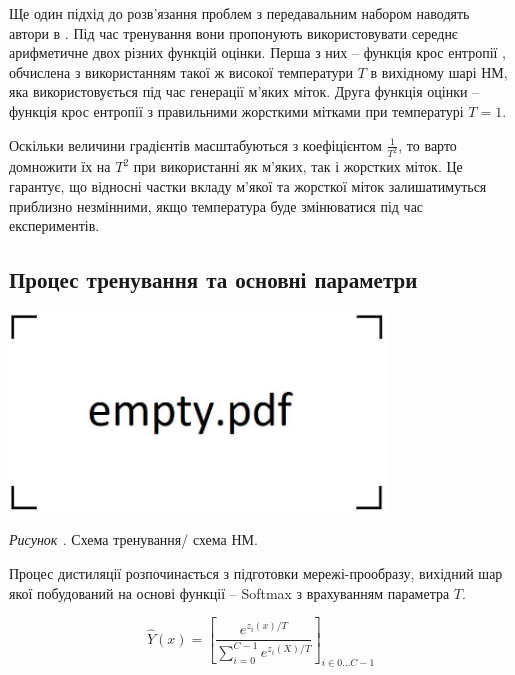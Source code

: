 \documentclass[14pt,a4paper]{extarticle}
\newcounter{e}
\newcounter{pic}
\newcommand{\pic}[1]{\refstepcounter{pic} \vspace{-0.3cm}\textit{Рисунок \arabic{pic}\label{#1}.}}
\numberwithin{equation}{section}
\numberwithin{figure}{section}
\begin{document}
 Ще один підхід до розв'язання проблем з передавальним набором наводять автори в \cite{distillation}. Під час тренування вони пропонують використовувати середнє арифметичне двох різних функцій оцінки. Перша з них -- функція крос ентропії 
 , обчислена з використанням такої ж високої температури $T$ в вихідному шарі НМ, яка використовується під час генерації м'яких міток. Друга функція оцінки -- функція крос ентропії з правильними жорсткими мітками при температурі $T=1$.
 
 
 Оскільки величини градієнтів масштабуються з коефіцієнтом $\frac{1}{T^2}$, то варто домножити їх на $T^2$ при використанні як м'яких, так і жорстких міток. Це гарантує, що відносні частки вкладу м'якої та жорсткої міток залишатимуться приблизно незмінними, якщо температура буде змінюватися під час експериментів.
 
 
 \subsection{Процес тренування та основні параметри} 
 
 \begin{center}
 	\includegraphics[width=10cm]{../images/empty.pdf}
 \end{center}
 \begin{center}
 	\pic{distilation} Схема тренування/ схема НМ.
 \end{center}
 
 Процес дистиляції розпочинається з підготовки мережі-прообразу, вихідний шар якої побудований на основі функції -- Softmax з врахуванням параметра $T$.
 
 \begin{equation}
 \label{softmax-t}
 \hat{Y}(x)=\left[\frac{e^{z_{i}(x) / T}}{\sum\limits_{i=0}^{C-1} e^{z_{i}(X) / T}}\right]_{i \in 0 \dots C-1}
 \end{equation}
\end{document}
